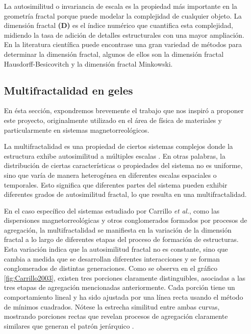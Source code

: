 \documentclass[11pt]{article}
\begin{document}
La autosimilitud o invariancia de escala es la propiedad m\'{a}s importante en la geometr\'{i}a fractal porque puede modelar la complejidad de cualquier objeto. La dimensi\'{o}n fractal \textbf{(D)} es el \'{i}ndice num\'{e}rico que cuantifica esta complejidad, midiendo la tasa de adici\'{o}n de detalles estructurales con una mayor ampliaci\'{o}n. En la literatura cient\'{i}fica puede encontrase una gran variedad de m\'{e}todos para determinar la dimensi\'{o}n fractal, algunos de ellos son la dimensi\'{o}n fractal Hausdorff-Besicovitch y la dimensi\'{o}n fractal Minkowski.

\subsection{Multifractalidad en geles}
\label{subsec:subseccion2.2}

En \'{e}sta secci\'{o}n, expondremos brevemente el
trabajo que nos inspir\'{o} a proponer este proyecto, 
originalmente utilizado en el \'{a}rea de f\'{i}sica de materiales 
y particularmente en sistemas magnetorreol\'{o}gicos. 

La multifractalidad es una propiedad de ciertos sistemas
 complejos donde la estructura exhibe autosimilitud a m\'{u}ltiples 
 escalas \cite{Posadas2001}. En otras palabras, la distribuci\'{o}n de ciertas 
 caracter\'{i}sticas o propiedades del sistema no es uniforme,
  sino que var\'{i}a de manera heterog\'{e}nea en diferentes 
  escalas espaciales o temporales. Esto significa que diferentes
   partes del sistema pueden exhibir diferentes grados de autosimilitud 
   fractal, lo que resulta en una multifractalidad.

En el caso espec\'{i}fico del sistemas estudiado por  
Carrillo \textit{et al.}\cite{Carrillo2003}, como las dispersiones
 magnetorreol\'{o}gicas y otros conglomerados formados 
 por procesos de agregaci\'{o}n, la multifractalidad se 
 manifiesta en la variaci\'{o}n de la dimensi\'{o}n fractal 
 a lo largo de diferentes etapas del proceso de formaci\'{o}n 
 de estructuras. Esta variaci\'{o}n indica que la autosimilitud
  fractal no es constante, sino que cambia a medida que se 
  desarrollan diferentes interacciones y se forman conglomerados 
  de distintas generaciones. Como se observa en el gr\'{a}fico \ref{fig:Carrillo2003},
   existen tres porciones claramente distinguibles, asociadas a las tres etapas 
   de agregaci\'{o}n mencionadas anteriormente. Cada porci\'{o}n tiene un comportamiento lineal y ha sido ajustada por una l\'{i}nea recta usando el m\'{e}todo de m\'{i}nimos cuadrados. N\'{o}tese la estrecha similitud entre ambas curvas, mostrando porciones rectas que revelan procesos de agregaci\'{o}n claramente similares que generan el patr\'{o}n jer\'{a}rquico \cite{Carrillo2003}.
\end{document}

